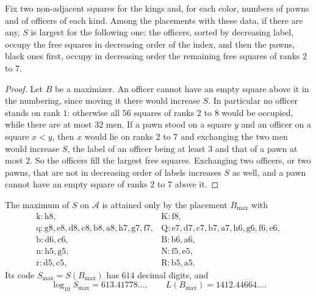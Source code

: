 \documentclass[12pt,reqno]{article}
\newcommand{\adm}{\mathcal{A}}
\newcommand{\sq}[1]{\mathrm{#1}}
\begin{document}
\begin{lemma}\label{lemplace}
Fix two non-adjacent squares for the kings and, for each color, numbers of pawns and of officers
of each kind. Among the placements with these data, if there are any, $S$ is largest for the
following one: the officers, sorted by decreasing label, occupy the free squares in decreasing
order of the index, and then the pawns, black ones first, occupy in decreasing order the
remaining free squares of ranks $2$ to $7$.
\end{lemma}

\begin{proof}
Let $B$ be a maximizer. An officer cannot have an empty square above it in the numbering,
since moving it there would increase $S$. In particular no officer stands on rank $1$: otherwise
all $56$ squares of ranks $2$ to $8$ would be occupied, while there are at most $32$ men. If a
pawn stood on a square $y$ and an officer on a square $x<y$, then $x$ would lie on ranks $2$ to
$7$ and exchanging the two men would increase $S$, the label of an officer being at least $3$ and
that of a pawn at most $2$. So the officers fill the largest free squares. Exchanging two officers,
or two pawns, that are not in decreasing order of labels increases $S$ as well, and a pawn
cannot have an empty square of ranks $2$ to $7$ above it.
\end{proof}

\begin{theorem}\label{thmmax}
The maximum of $S$ on $\adm$ is attained only by the placement $B_{\max}$ with
\begin{displaymath}
\begin{array}{ll}
\sq{k}\colon \sq{h8}, & \sq{K}\colon \sq{f8},\\
\sq{q}\colon \sq{g8},\sq{e8},\sq{d8},\sq{c8},\sq{b8},\sq{a8},\sq{h7},\sq{g7},\sq{f7}, &
\sq{Q}\colon \sq{e7},\sq{d7},\sq{c7},\sq{b7},\sq{a7},\sq{h6},\sq{g6},\sq{f6},\sq{e6},\\
\sq{b}\colon \sq{d6},\sq{c6}, & \sq{B}\colon \sq{b6},\sq{a6},\\
\sq{n}\colon \sq{h5},\sq{g5}, & \sq{N}\colon \sq{f5},\sq{e5},\\
\sq{r}\colon \sq{d5},\sq{c5}, & \sq{R}\colon \sq{b5},\sq{a5} .
\end{array}
\end{displaymath}
Its code $S_{\max}=S(B_{\max})$ has $614$ decimal digits, and
\begin{displaymath}
\log_{10}S_{\max}=613.41778\ldots,\qquad L(B_{\max})=1412.44664\ldots .
\end{displaymath}
\end{theorem}
\end{document}
